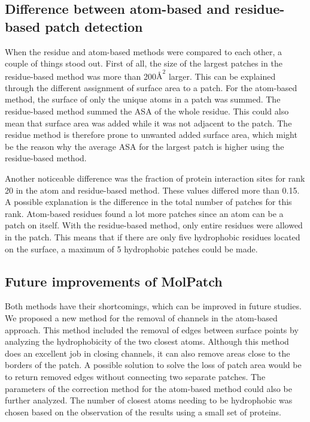 \documentclass[11pt,a4paper]{article}
\begin{document}
\subsection{Difference between atom-based and residue-based patch detection}

When the residue and atom-based methods were compared to each other, a couple of things stood out. First of all, the size of the largest patches in the residue-based method was more than 200$\si{\angstrom}^2$ larger. This can be explained through the different assignment of surface area to a patch. For the atom-based method, the surface of only the unique atoms in a patch was summed. The residue-based method summed the ASA of the whole residue. This could also mean that surface area was added while it was not adjacent to the patch. The residue method is therefore prone to unwanted added surface area, which might be the reason why the average ASA for the largest patch is higher using the residue-based method.

Another noticeable difference was the fraction of protein interaction sites for rank 20 in the atom and residue-based method. These values differed more than 0.15. A possible explanation is the difference in the total number of patches for this rank. Atom-based residues found a lot more patches since an atom can be a patch on itself. With the residue-based method, only entire residues were allowed in the patch. This means that if there are only five hydrophobic residues located on the surface, a maximum of 5 hydrophobic patches could be made. 
	
\subsection{Future improvements of MolPatch}

Both methods have their shortcomings, which can be improved in future studies. We proposed a new method for the removal of channels in the atom-based approach. This method included the removal of edges between surface points by analyzing the hydrophobicity of the two closest atoms. Although this method does an excellent job in closing channels, it can also remove areas close to the borders of the patch. A possible solution to solve the loss of patch area would be to return removed edges without connecting two separate patches. The parameters of the correction method for the atom-based method could also be further analyzed. The number of closest atoms needing to be hydrophobic was chosen based on the observation of the results using a small set of proteins. 
    
\end{document}
